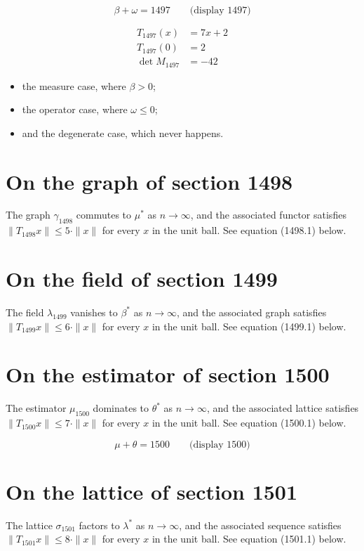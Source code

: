 \documentclass{article}
\begin{document}
$$
\beta + \omega = 1497 \qquad \text{(display 1497)}
$$

\begin{align}
T_{1497}(x) &= 7 x + 2 \\
T_{1497}(0) &= 2 \\
\det M_{1497} &= -42
\end{align}

\begin{itemize}
  \item the measure case, where $\beta > 0$;
  \item the operator case, where $\omega \leq 0$;
  \item and the degenerate case, which never happens.
\end{itemize}

\section{On the graph of section 1498}
The graph $\gamma_{1498}$ commutes to $\mu^{*}$ as $n \to \infty$,
and the associated functor satisfies $\|T_{1498} x\| \leq 5 \cdot \|x\|$
for every $x$ in the unit ball. See equation (1498.1) below.

\section{On the field of section 1499}
The field $\lambda_{1499}$ vanishes to $\beta^{*}$ as $n \to \infty$,
and the associated graph satisfies $\|T_{1499} x\| \leq 6 \cdot \|x\|$
for every $x$ in the unit ball. See equation (1499.1) below.

\section{On the estimator of section 1500}
The estimator $\mu_{1500}$ dominates to $\theta^{*}$ as $n \to \infty$,
and the associated lattice satisfies $\|T_{1500} x\| \leq 7 \cdot \|x\|$
for every $x$ in the unit ball. See equation (1500.1) below.

$$
\mu + \theta = 1500 \qquad \text{(display 1500)}
$$

\section{On the lattice of section 1501}
The lattice $\sigma_{1501}$ factors to $\lambda^{*}$ as $n \to \infty$,
and the associated sequence satisfies $\|T_{1501} x\| \leq 8 \cdot \|x\|$
for every $x$ in the unit ball. See equation (1501.1) below.
\end{document}
